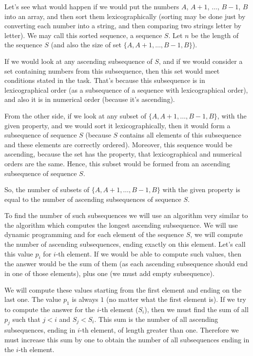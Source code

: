 

Let's see what would happen if we would put the numbers $A$, $A+1$, $\ldots$, $B-1$, $B$ into an array,
	and then sort them lexicographically
		(sorting may be done just by converting each number into a string, and then comparing two strings letter by letter).
We may call this sorted sequence, a sequence $S$.
Let $n$ be the length of the sequence $S$ (and also the size of set $\{A, A+1, \ldots, B-1, B\}$).

If we would look at any ascending subsequence of $S$, and if we would consider
	a set containing numbers from this subsequence, then this set would meet conditions stated in the task.
That's because this subsequence is in lexicographical order (as a subsequence of a sequence with lexicographical order),
	and also it is in numerical order (because it's ascending).

From the other side, if we look at any subset of $\{A, A+1, \ldots, B-1, B\}$,
	with the given property, and we would sort it lexicographically,
	then it would form a subsequence of sequence $S$
		(because $S$ contains all elements of this subsequence and these elements are correctly ordered).
Moreover, this sequence would be ascending, because the set has the property, that lexicographical and numerical
	orders are the same.
Hence, this subset would be formed from an ascending subsequence of sequence $S$.

So, the number of subsets of $\{A, A+1, \ldots, B-1, B\}$ with the given property
	is equal to the number of ascending subsequences of sequence $S$.

To find the number of such subsequences we will use an algorithm very similar to the algorithm
	which computes the longest ascending subsequence.
We will use dynamic programming and for each element of the sequence $S$,
	we will compute the number of ascending subsequences, ending exactly on this element.
Let's call this value $p_i$ for $i$-th element.
If we would be able to compute such values, then the answer would be the sum of them
	(as each ascending subsequence should end in one of those elements), plus one (we must add empty subsequence).

We will compute these values starting from the first element and ending on the last one.
The value $p_1$ is always $1$ (no matter what the first element is).
If we try to compute the answer for the $i$-th element ($S_i$),
	then we must find the sum of all $p_j$ such that $j < i$ and $S_j < S_i$.
This sum is the number of all ascending subsequences, ending in $i$-th element, of length greater than one.
Therefore we must increase this sum by one to obtain the number of all subsequences ending in the $i$-th element.

